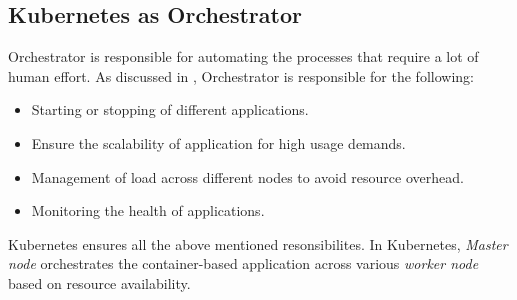 \subsection{Kubernetes as Orchestrator}
\label{sec:k8s_orchestrator}
Orchestrator is responsible for automating the processes that require a lot of human effort. As discussed in \cite{containerjournal}, Orchestrator is responsible for the following:
\begin{itemize}
  \item Starting or stopping of different applications.
  \item Ensure the scalability of application for high usage demands.
  \item Management of load across different nodes to avoid resource overhead.
  \item Monitoring the health of applications.
\end{itemize}
Kubernetes ensures all the above mentioned resonsibilites. In Kubernetes, \emph{Master node} orchestrates the container-based application across various \emph{worker node} based on resource availability\cite{k8s}.
